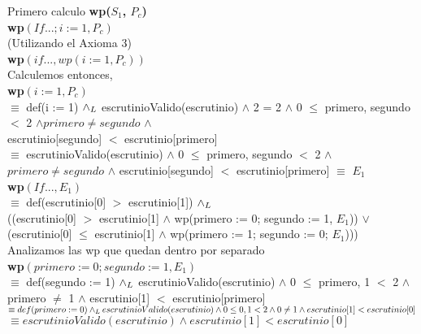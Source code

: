\documentclass[10pt,a4paper]{article}
\begin{document}
\noindent Primero calculo \textbf{wp($S_1$, $P_c$)} \\

\noindent \textbf{wp$(If ...; i := 1, P_c)$} \\

\noindent (Utilizando el Axioma 3)\\

\noindent \textbf{wp$(if ..., wp(i:=1, P_c))$}\\

\noindent Calculemos entonces, \\

\noindent \textbf{wp$(i:=1, P_c)$} \vspace{0.1cm} \\
\noindent $\equiv$ def(i := 1) $\land _L$  escrutinioValido(escrutinio) $\land$ 2 = 2 $\land$ 0 $\leq$ primero, segundo $<$ 2 $\land  primero \neq segundo$ $\land$ \\ escrutinio[segundo] $<$ escrutinio[primero] \\
\noindent $\equiv$ escrutinioValido(escrutinio) $\land$ 0 $\leq$ primero, segundo $<$ 2 $\land$  $primero \neq segundo$ $\land$ escrutinio[segundo] $<$ escrutinio[primero]  $\equiv$ $E_1$ \\

\noindent \textbf{wp$(If... , E_1)$} \vspace{0.1cm} \\
\noindent $\equiv$ def(escrutinio[0] $>$ escrutinio[1]) $\land _L$ \\  ((escrutinio[0] $>$ escrutinio[1]  $\land$ wp(primero := 0; segundo := 1, $E_1$)) $\lor$ \\
(escrutinio[0] $\leq$ escrutinio[1] $\land$ wp(primero := 1; segundo := 0; $E_1$)))  \vspace{0.1cm} \\

\noindent Analizamos las wp que quedan dentro por separado \\

\noindent \textbf{wp$(primero := 0; segundo := 1, E_1)$} \vspace{0.1cm} \\

\noindent $\equiv$ def(segundo := 1) $\land _L$ escrutinioValido(escrutinio) $\land$ 0 $\leq$ primero, 1 $<$ 2 $\land$ primero $\neq$ 1 $\land$ escrutinio[1] $<$ escrutinio[primero] \\
\noindent $\equiv def(primero := 0) \land _L escrutinioValido(escrutinio) \land 0 \leq 0, 1 < 2 \land 0 \neq 1 \land escrutinio[1] < escrutinio[0] $ \\
\noindent $\equiv escrutinioValido(escrutinio) \land escrutinio[1] < escrutinio[0] $ \\
\end{document}
